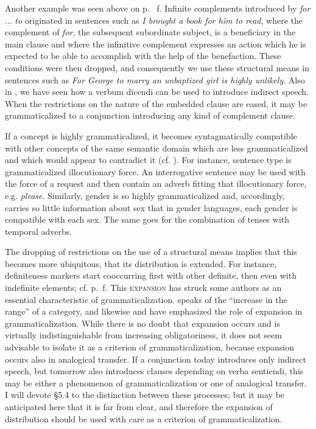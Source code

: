 Another example was seen above on p.~\pageref{page72}\chk%
f. Infinite complements introduced by \textit{for} ... \textit{to} originated in sentences such as \textit{I brought a book for him to read}, where the complement of \textit{for}, the subsequent subordinate subject, is a beneficiary in the main clause and where the infinitive complement expresses an action which he is expected to be able to accomplish with the help of the benefaction. These conditions were then dropped, and consequently we use these structural means in sentences such as \textit{For George to marry an unbaptized girl is highly unlikely}. Also in , we have seen how a verbum dicendi can be used to introduce indirect speech. When the restrictions on the nature of the embedded clause are eased, it may be grammaticalized to a conjunction introducing any kind of complement clause.

If a concept is highly grammaticalized, it becomes syntagmatically compatible with other concepts of the same semantic domain which are less grammaticalized and which would appear to contradict it (cf. \citealt[Ch. 15]{Paul1920}). For instance, sentence type is grammaticalized illocutionary force. An interrogative sentence may be used with the force of a request and then contain an adverb fitting that illocutionary force, e.g. \textit{please}. Similarly, gender is so highly grammaticalized and, accordingly, carries so little information about sex that in gender languages, each gender is compatible with each sex. The same goes for the combination of tenses with temporal adverbs.

The dropping of restrictions on the use of a structural means implies that this becomes more ubiquitous, that its distribution is extended. For instance, definiteness markers start cooccurring first with other definite, then even with indefinite elements; cf. p.~\pageref{page42}f. \chk%
This \textsc{expansion} has struck some authors as an essential characteristic of grammaticalization. \citet[41]{Kuryłowicz1965} speaks of the “increase in the range” of a category, and likewise \citet[184--188]{Lord1976} and \citet[39--41]{HeineEtAl1984} have emphasized the role of expansion in grammaticalization. While there is no doubt that expansion occurs and is virtually indistinguishable from increasing obligatoriness, it does not seem advisable to isolate it as a criterion of grammaticalization, because expansion occurs also in analogical transfer. If a conjunction today introduces only indirect speech, but tomorrow also introduces clauses depending on verba sentiendi, this may be either a phenomenon of grammaticalization or one of analogical transfer. I will devote §5.4 to the distinction between these processes; but it may be anticipated here that it is far from clear, and therefore the expansion of distribution should be used with care as a criterion of grammaticalization.

